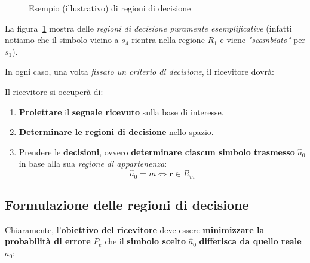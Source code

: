 \begin{figure}[!ht]
    \caption{Esempio (illustrativo) di regioni di decisione}
    \label{fig:08_08_RegioniDecisioneEsempio}
\end{figure}

La figura~\ref{fig:08_08_RegioniDecisioneEsempio} mostra delle 
\textit{regioni di decisione puramente esemplificative} (infatti notiamo
che il simbolo vicino a $s_{4}$ rientra nella regione $R_{1}$ e viene \textit{"scambiato"}
per $s_{1}$).

In ogni caso, una volta \textit{fissato un criterio di decisione}, il ricevitore
dovrà:

\begin{remark}
    Il ricevitore si occuperà di:
    \begin{enumerate}
        \item \textbf{Proiettare} il \textbf{segnale ricevuto} sulla base
            di interesse.
        \item \textbf{Determinare le regioni di decisione} nello spazio.
        \item Prendere le \textbf{decisioni}, ovvero \textbf{determinare ciascun simbolo trasmesso}
            $\hat{a}_0$ in base alla sua \textit{regione di appartenenza}:
            \[
                \hat{a}_0 = m \Leftrightarrow \mathbf{r} \in R_m
            \] 
    \end{enumerate}
\end{remark}

\subsection{Formulazione delle regioni di decisione}

Chiaramente, l'\textbf{obiettivo del ricevitore} deve essere 
\textbf{minimizzare la probabilità di errore} $P_e$ che il 
\textbf{simbolo scelto} $\hat{a}_0$ \textbf{differisca da quello reale} $a_{0}$:

